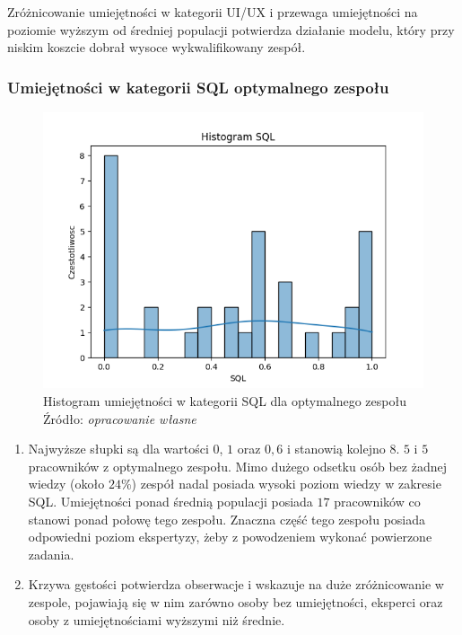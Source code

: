         \par Zróżnicowanie umiejętności w kategorii UI/UX i przewaga umiejętności na poziomie wyższym od średniej populacji potwierdza działanie modelu, który przy niskim koszcie dobrał wysoce wykwalifikowany zespół.
        
        \subsubsection{Umiejętności w kategorii SQL optymalnego zespołu}
        \begin{figure}[H]
            \centering
            \includegraphics[width=\linewidth]{chapters/Images/hist_sql_optimal.png}
            \cprotect\caption{Histogram umiejętności w kategorii SQL dla optymalnego zespołu\\ Źródło:\textit{ opracowanie własne}}
            \label{fig:hist_sql_optimal}
        \end{figure}

        \begin{enumerate}
            \item Najwyższe słupki są dla wartości $0$, $1$ oraz $0,6$ i stanowią kolejno $8$. $5$ i $5$ pracowników z optymalnego zespołu. Mimo dużego odsetku osób bez żadnej wiedzy (około $24\%$) zespół nadal posiada wysoki poziom wiedzy w zakresie SQL. Umiejętności ponad średnią populacji posiada $17$ pracowników co stanowi ponad połowę tego zespołu. Znaczna część tego zespołu posiada odpowiedni poziom ekspertyzy, żeby z powodzeniem wykonać powierzone zadania.
            \item Krzywa gęstości potwierdza obserwacje i wskazuje na duże zróżnicowanie w zespole, pojawiają się w nim zarówno osoby bez umiejętności, eksperci oraz osoby z umiejętnościami wyższymi niż średnie.
        \end{enumerate}

